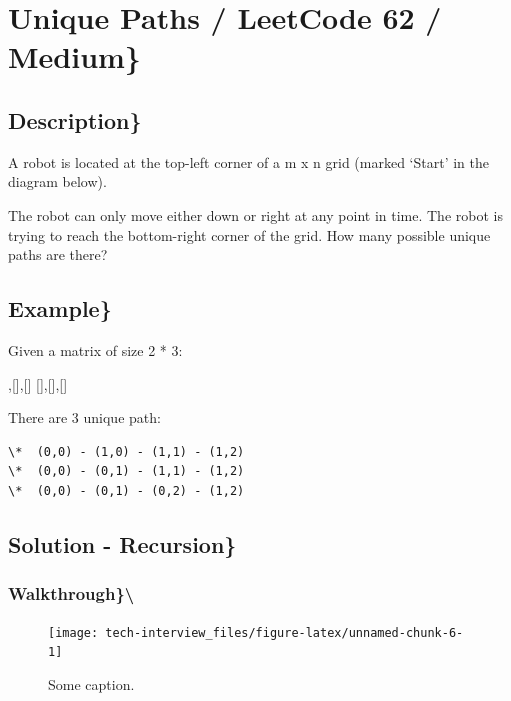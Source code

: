 \documentclass[]{book}
\newenvironment{Shaded}{\begin{snugshade}}{\end{snugshade}}
\newcommand{\NormalTok}[1]{#1}
\begin{document}
\hypertarget{unique-paths-leetcode-62-medium}{%
\section{Unique Paths / LeetCode 62 / Medium\}}\label{unique-paths-leetcode-62-medium}}

\hypertarget{description-46}{%
\subsection{Description\}}\label{description-46}}

A robot is located at the top-left corner of a m x n grid (marked `Start' in the diagram below).

The robot can only move either down or right at any point in time. The robot is trying to reach the bottom-right corner
of the grid. How many possible unique paths are there?

\hypertarget{example-44}{%
\subsection{Example\}}\label{example-44}}

Given a matrix of size 2 * 3:

\begin{Shaded}
\begin{Highlighting}[]
\NormalTok{[],[],[]}
\NormalTok{[],[],[]}
\end{Highlighting}
\end{Shaded}

There are 3 unique path:

\begin{verbatim}
\*  (0,0) - (1,0) - (1,1) - (1,2)
\*  (0,0) - (0,1) - (1,1) - (1,2)
\*  (0,0) - (0,1) - (0,2) - (1,2)
\end{verbatim}

\hypertarget{solution---recursion-1}{%
\subsection{Solution - Recursion\}}\label{solution---recursion-1}}

\hypertarget{walkthrough-46}{%
\subsubsection{Walkthrough\}\textbackslash{}}\label{walkthrough-46}}

\begin{figure}
\texttt{[image: tech-interview\_files/figure-latex/unnamed-chunk-6-1]} \caption{Some caption.}\label{fig:unnamed-chunk-6}
\end{figure}
\end{document}
